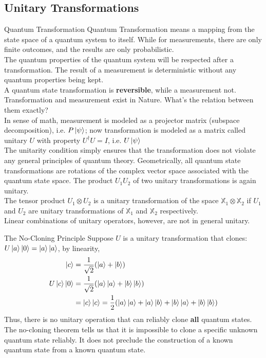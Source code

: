 \documentclass{beamer}
\begin{document}
\subsection{Unitary Transformations}
\begin{frame}{Quantum Transformation}
  {\tiny
    Quantum Transformation means a mapping from the state space of a quantum system to itself.
    While for measurements, there are only finite outcomes, and the results are only probabilistic.\\
    The quantum properties of the quantum system will be respected after a transformation.
    The result of a measurement is deterministic without any quantum properties being kept.\\
    A quantum state transformation is \textbf{reversible}, while a measurement not.\\
    Transformation and measurement exist in Nature. What's the relation between them exactly?\\
    \vspace{0.3cm}
    In sense of math, measurement is modeled as a projector matrix (subspace decomposition), i.e. $P\ket{\psi}$;
    now transformation is modeled as a matrix called unitary $U$ with property $U^{\dagger}U = I$, i.e. $U\ket{\psi}$\\
    The unitarity condition simply ensures that the transformation does not violate any general principles of quantum theory.
    Geometrically, all quantum state transformations are rotations of the complex vector space associated with the quantum state space.
    \vspace{0.3cm}
    The product $U_1 U_2$ of two unitary transformations is again unitary. \\
    The tensor product $U_1 \otimes U_2$ is a unitary transformation of the space $\mathbb{X}_1 \otimes \mathbb{X}_2$ if $U_1$ and $U_2$ are unitary transformations of $\mathbb{X}_1$ and $\mathbb{X}_2$ respectively.\\
    Linear combinations of unitary operators, however, are not in general unitary.
  }%
\end{frame}

\begin{frame}{The No-Cloning Principle}
  {\tiny
    Suppose $U$ is a unitary transformation that clones: $U\ket{a}\ket{0} = \ket{a}\ket{a}$, by linearity,
    \begin{align*}
      \ket{c} &= \frac{1}{\sqrt2} (\ket{a} + \ket{b}) \\
      U\ket{c}\ket{0} &=  \frac{1}{\sqrt2} ( \ket{a}\ket{a} + \ket{b}\ket{b} ) \\
                      &=  \ket{c}\ket{c} = \frac{1}{2} (  \ket{a}\ket{a} + \ket{a}\ket{b} + \ket{b}\ket{a} + \ket{b}\ket{b} )
    \end{align*}
    Thus, there is no unitary operation that can reliably clone \textbf{all} quantum states.
    The no-cloning theorem tells us that it is impossible to clone a specific unknown quantum state reliably.
    It does not preclude the construction of a known quantum state from a known quantum state.
  }%
\end{frame}
\end{document}
